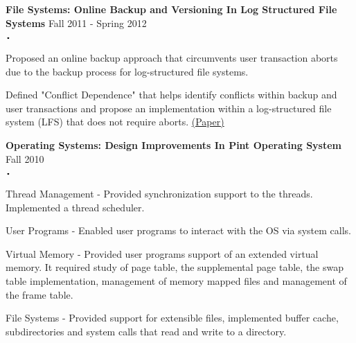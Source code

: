 \documentclass{article}
\newcommand{\sbt}{\,\begin{picture}(-1,1)(-1,-3)\circle*{2}\end{picture}\ }
\newcommand{\project}[2]{{ \textbf{#1} \hfill #2\\  }}
\newenvironment{achievements}{\begin{list}{$\sbt$}{\topsep -2pt \itemsep -2pt}}{\vspace*{0pt}\end{list}}
\begin{document}
\project{File Systems: Online Backup and Versioning In Log Structured File Systems}{Fall 2011 - Spring 2012}
	\begin{achievements}
	 \item Proposed an online backup approach that circumvents user transaction aborts due to the backup process for log-structured file systems. 
	 \item Defined "Conflict Dependence" that helps identify conflicts within backup and user transactions and propose an implementation within a log-structured file system (LFS) that does not require aborts.
	 \href{http://www.academia.edu/2085652/Online_backup_and_versioning_in_log_structured_file_systems}{(Paper)}
	\end{achievements}
\vspace{3mm} 

\project{Operating Systems: Design Improvements In Pint Operating System}{Fall 2010}
	\begin{achievements}
	 \item Thread Management - Provided synchronization support to the threads. Implemented a thread scheduler.
	 \item User Programs - Enabled user programs to interact with the OS via system calls.
	 \item Virtual Memory - Provided user programs support of an extended virtual memory. It required study of page table, the supplemental page table, the swap table implementation, management of memory mapped files and management of the frame table.
	\item File Systems - Provided support for extensible files, implemented buffer cache, subdirectories and system calls that read and write to a directory.
	\end{achievements}
\vspace{3mm} 
\end{document}
